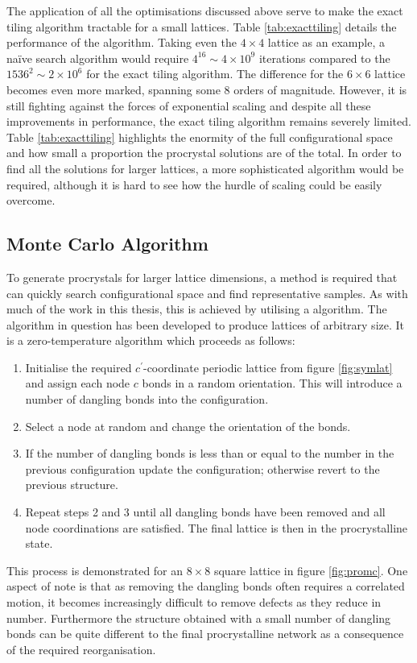The application of all the optimisations discussed above serve to make the exact tiling algorithm tractable for a small lattices.
Table \ref{tab:exacttiling} details the performance of the algorithm.
Taking even the $4\times 4$ lattice as an example, a na\"ive search algorithm would require $4^{16}\sim 4\times10^9$ iterations compared to the $1536^2\sim 2\times10^6$ for the exact tiling algorithm.
The difference for the $6\times 6$ lattice becomes even more marked, spanning some 8 orders of magnitude.
However, it is still fighting against the forces of exponential scaling and despite all these improvements in performance, the exact tiling algorithm remains severely limited. 
Table \ref{tab:exacttiling} highlights the enormity of the full configurational space and how small a proportion the procrystal solutions are of the total.
In order to find all the solutions for larger lattices, a more sophisticated algorithm would be required, although it is hard to see how the hurdle of scaling could be easily overcome.

\subsection{Monte Carlo Algorithm}

To generate procrystals for larger lattice dimensions, a method is required that can quickly search configurational space and find representative samples.
As with much of the work in this thesis, this is achieved by utilising a \mc{} algorithm.
The algorithm in question has been developed to produce lattices of arbitrary size.
It is a zero\--temperature \mc{} algorithm which proceeds as follows:
\begin{enumerate}
	\item Initialise the required $c^\prime$\--coordinate periodic lattice from figure \ref{fig:symlat} and assign each node $c$ bonds in a random orientation. This will introduce a number of dangling bonds into the configuration.
	\item Select a node at random and change the orientation of the bonds.
	\item If the number of dangling bonds is less than or equal to the number in the previous configuration update the configuration; otherwise revert to the previous structure.
	\item Repeat steps 2 and 3 until all dangling bonds have been removed and all node coordinations are satisfied.
	The final lattice is then in the procrystalline state.
\end{enumerate}
This process is demonstrated for an $8\times 8$ square lattice in figure \ref{fig:promc}.
One aspect of note is that as removing the dangling bonds often requires a correlated motion, it becomes increasingly difficult to remove defects as they reduce in number.
Furthermore the structure obtained with a small number of dangling bonds can be quite different to the final procrystalline network as a consequence of the required reorganisation.

